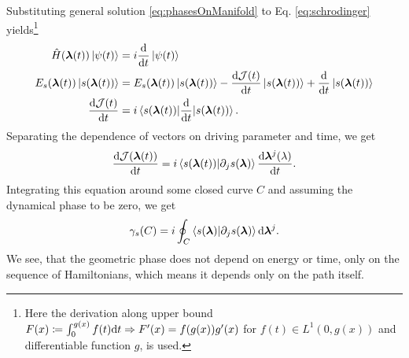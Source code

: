 

Substituting general solution \ref{eq:phasesOnManifold} to Eq. \ref{eq:schrodinger} yields\footnote{Here the derivation along upper bound $F(x)\coloneqq\int_0^{g(x)}f(t)\mathrm{d} t \Rightarrow F'(x)=f(g(x))g'(x)$ for $f(t)\in L^1(0,g(x))$ and differentiable function $g$, is used.} 
\begin{align}
    \hat{H}({\bm\lambda}(t))\ket{\psi(t)} &= i\frac{\mathrm{d} }{\mathrm{d} t}\ket{\psi(t)}\\
    E_s({\bm\lambda}(t)) \ket{s({\bm\lambda}(t))} &= E_s({\bm\lambda}(t))\ket{s({\bm\lambda}(t))} -\frac{\mathrm{d} \mathcal J(t)}{\mathrm{d} t}\ket{s({\bm\lambda}(t))}+ \frac{\mathrm{d} }{\mathrm{d} t}\ket{s({\bm\lambda}(t))}\\
    \frac{\mathrm{d} \mathcal J(t)}{\mathrm{d} t}&=i\braket{s({\bm\lambda}(t))|
    \frac{\mathrm{d} }{\mathrm{d} t}|s({\bm\lambda}(t))}.
\end{align}
 Separating the dependence of vectors on driving parameter and time, we get
\begin{equation}
    \frac{\mathrm{d} \mathcal J({\bm\lambda}(t))}{\mathrm{d} t} =i\braket{s({\bm\lambda}(t))|\partial_j s({\bm\lambda})} \frac{\mathrm{d} {\bm\lambda}^j(\lambda)}{\mathrm{d} t} .
\end{equation}
Integrating this equation around some closed curve $C$ and assuming the dynamical phase to be zero, we get
\begin{equation}
    \gamma_s(C)=i\oint_C\braket{s({\bm\lambda})|\partial_j s({\bm\lambda})}\mathrm{d} {\bm\lambda}^j.
    \label{eq:gammaCoint}
\end{equation}
We see, that the geometric phase does not depend on energy or time, only on the sequence of Hamiltonians, which means it depends only on the path itself.




